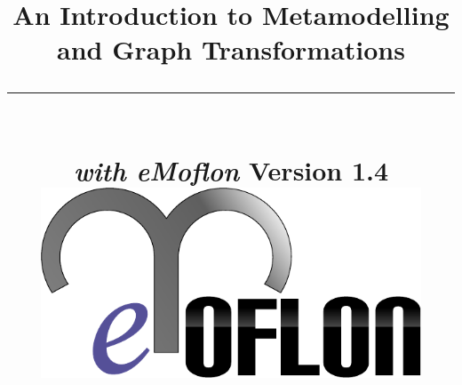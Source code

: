 \title{
\flushright
{\LARGE\bfseries An Introduction to Metamodelling\\
and Graph Transformations}
\noindent\rule[-1ex]{\textwidth}{5pt}\\[2.5ex]
\hfill\emph{\LARGE\bfseries with eMoflon}
\flushleft
{\small Version 1.4}
\flushright
\includegraphics[width=0.85\textwidth]{pics/eMoflon3} 
}

\date{}  
\author{} 